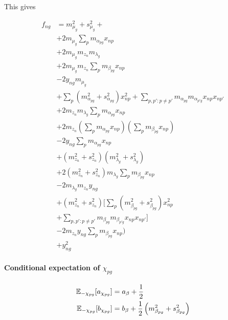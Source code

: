 This gives

\begin{equation}
\begin{aligned}
f_{ng}  & =  
m_{\mu_g}^2 + s_{\mu_g}^2 + \\ %
& + 2 m_{\mu_g} \sum_p m_{\alpha_{pg}} x_{np}  \\ %
&  + 2 m_{\mu_g} m_{z_n} m_{\lambda_g} \\ %
& + 2 m_{\mu_g} m_{z_n} \sum_p m_{\beta_{pg}} x_{np} \\ %
& - 2 y_{ng} m_{\mu_g} \\ %
& + \sum_p (m_{\alpha_{pg}}^2 + s_{\alpha_{pg}}^2) x_{np}^2 + \sum_{p,p':p\neq p'} m_{\alpha_{pg}} m_{\alpha_{p'g}} x_{np} x_{np'} \\ %
& + 2 m_{z_n} m_{\lambda_g} \sum_p m_{\alpha_{pg}} x_{np} \\ %
& + 2 m_{z_n} (\sum_p m_{\alpha_{pg}} x_{np})(\sum_p m_{\beta_{pg}} x_{np}) \\ %
& - 2 y_{ng} \sum_p m_{\alpha_{pg}} x_{np} \\ %
& +  (m_{z_n}^2 + s_{z_n}^2) (m_{\lambda_g}^2 + s_{\lambda_g}^2) \\ %
& + 2 (m_{z_n}^2 + s_{z_n}^2) m_{\lambda_g} \sum_p m_{\beta_{pg}} x_{np} \\ %
& -2 m_{\lambda_g} m_{z_n} y_{ng} \\ %
& +(m_{z_n}^2 + s_{z_n}^2) \Big[  \sum_p (m_{\beta_{pg}}^2 + s_{\beta_{pg}}^2) x_{np}^2 \\
& + \sum_{p,p':p\neq p'} m_{\beta_{pg}} m_{\beta_{p'g}} x_{np} x_{np'} \Big] \\ %
& - 2 m_{z_n} y_{ng} \sum_p m_{\beta_{pg}} x_{np} ) \\ %
& + y_{ng}^2  %
\end{aligned}
\end{equation}


\paragraph{Conditional expectation of $\chi_{pg}$}

\begin{equation}
\begin{aligned}
\mathbb{E}_{-\chi_{pg}}[a_{\chi_{pg}}] & = a_\beta + \frac{1}{2} \\
\mathbb{E}_{-\chi_{pg}}[b_{\chi_{pg}}] & = b_\beta + \frac{1}{2}\left(
m_{\beta_{pg}}^2 + s_{\beta_{pg}}^2 \right)
\end{aligned}
\end{equation}


